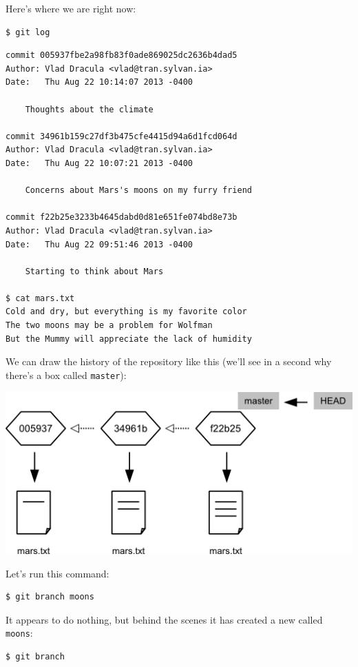 \documentclass{book}
\begin{document}
Here's where we are right now:

\begin{verbatim}
$ git log
\end{verbatim}

\begin{verbatim}
commit 005937fbe2a98fb83f0ade869025dc2636b4dad5
Author: Vlad Dracula <vlad@tran.sylvan.ia>
Date:   Thu Aug 22 10:14:07 2013 -0400

    Thoughts about the climate

commit 34961b159c27df3b475cfe4415d94a6d1fcd064d
Author: Vlad Dracula <vlad@tran.sylvan.ia>
Date:   Thu Aug 22 10:07:21 2013 -0400

    Concerns about Mars's moons on my furry friend

commit f22b25e3233b4645dabd0d81e651fe074bd8e73b
Author: Vlad Dracula <vlad@tran.sylvan.ia>
Date:   Thu Aug 22 09:51:46 2013 -0400

    Starting to think about Mars

$ cat mars.txt
Cold and dry, but everything is my favorite color
The two moons may be a problem for Wolfman
But the Mummy will appreciate the lack of humidity
\end{verbatim}

We can draw the history of the repository like this (we'll see in a
second why there's a box called \texttt{master}):

\includegraphics{novice/extras/img/git-branching-01.png}

Let's run this command:

\begin{verbatim}
$ git branch moons
\end{verbatim}

It appears to do nothing, but behind the scenes it has created a new
 called \texttt{moons}:

\begin{verbatim}
$ git branch
\end{verbatim}
\end{document}
